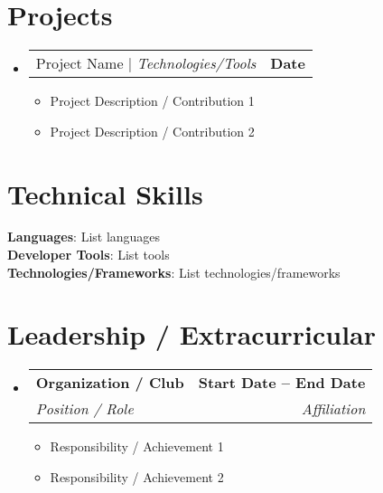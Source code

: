 \documentclass[letterpaper,11pt]{article}
\makeatletter
\newcommand{\resumeItem}[1]{\item\small{#1 \vspace{-2pt}}}
\newcommand{\resumeSubheading}[4]{
  \vspace{-2pt}\item
  \begin{tabular*}{1.0\textwidth}[t]{l@{\extracolsep{\fill}}r}
    \textbf{#1} & \textbf{\small #2} \\
    \textit{\small#3} & \textit{\small #4} \\
  \end{tabular*}\vspace{-7pt}
}
\newcommand{\resumeProjectHeading}[2]{
    \item
    \begin{tabular*}{1.0\textwidth}{l@{\extracolsep{\fill}}r}
      \small#1 & \textbf{\small #2}\\
    \end{tabular*}\vspace{-7pt}
}
\newcommand{\resumeItemListStart}{\begin{itemize}}
\newcommand{\resumeItemListEnd}{\end{itemize}\vspace{-5pt}}
\newcommand{\resumeSubHeadingListStart}{\begin{itemize}[leftmargin=0.0in, label={}]}
\newcommand{\resumeSubHeadingListEnd}{\end{itemize}}
\makeatother
\begin{document}
\section{Projects}
\resumeSubHeadingListStart
  \resumeProjectHeading
      {Project Name | \emph{Technologies/Tools}}{Date}
      \resumeItemListStart
        \resumeItem{Project Description / Contribution 1}
        \resumeItem{Project Description / Contribution 2}
      \resumeItemListEnd
\resumeSubHeadingListEnd

\section{Technical Skills}
\begin{itemize}[leftmargin=0.15in, label={}]
    \small{\item{
     \textbf{Languages}{: List languages} \\
     \textbf{Developer Tools}{: List tools} \\
     \textbf{Technologies/Frameworks}{: List technologies/frameworks} \\
    }}
\end{itemize}

\section{Leadership / Extracurricular}
\resumeSubHeadingListStart
  \resumeSubheading
    {Organization / Club}{Start Date -- End Date}
    {Position / Role}{Affiliation}
    \resumeItemListStart
        \resumeItem{Responsibility / Achievement 1}
        \resumeItem{Responsibility / Achievement 2}
    \resumeItemListEnd
\resumeSubHeadingListEnd
\end{document}
